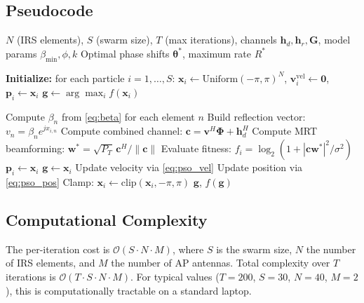 \documentclass[12pt, a4paper]{article}
\newcommand{\vect}[1]{\mathbf{#1}}          %
\newcommand{\mat}[1]{\mathbf{#1}}           %
\newcommand{\norm}[1]{\left\|#1\right\|}    %
\begin{document}
\subsection{Pseudocode}
\begin{algorithm}[H]
\caption{PSO for IRS Phase Shift Optimization}
\label{alg:pso}
\begin{algorithmic}[1]
\Require $N$ (IRS elements), $S$ (swarm size), $T$ (max iterations),
         channels $\vect{h}_d, \vect{h}_r, \mat{G}$,
         model params $\beta_{\min}, \phi, k$
\Ensure  Optimal phase shifts $\vect{\theta}^*$, maximum rate $R^*$

\State \textbf{Initialize:} for each particle $i = 1,\ldots,S$:
    $\vect{x}_i \leftarrow \text{Uniform}(-\pi, \pi)^N$,
    $\vect{v}_i^{\text{vel}} \leftarrow \vect{0}$,
    $\vect{p}_i \leftarrow \vect{x}_i$
\State $\vect{g} \leftarrow \arg\max_i f(\vect{x}_i)$

        \State Compute $\beta_n$ from \eqref{eq:beta} for each element $n$
        \State Build reflection vector: $v_n = \beta_n e^{j x_{i,n}}$
        \State Compute combined channel:
               $\vect{c} = \vect{v}^H\boldsymbol{\Phi} + \vect{h}_d^H$
        \State Compute MRT beamforming:
               $\vect{w}^* = \sqrt{P_T}\,\vect{c}^H / \norm{\vect{c}}$
        \State Evaluate fitness: $f_i = \log_2(1 + |\vect{c}\vect{w}^*|^2/\sigma^2)$
        \If{$f_i > f(\vect{p}_i)$}
            $\vect{p}_i \leftarrow \vect{x}_i$
        \EndIf
        \If{$f_i > f(\vect{g})$}
            $\vect{g} \leftarrow \vect{x}_i$
        \EndIf
        \State Update velocity via \eqref{eq:pso_vel}
        \State Update position via \eqref{eq:pso_pos}
        \State Clamp: $\vect{x}_i \leftarrow \text{clip}(\vect{x}_i, -\pi, \pi)$
    \EndFor
\EndFor
\State \Return $\vect{g}$, $f(\vect{g})$
\end{algorithmic}
\end{algorithm}

\subsection{Computational Complexity}
The per-iteration cost is $\mathcal{O}(S \cdot N \cdot M)$, where $S$ is the
swarm size, $N$ the number of IRS elements, and $M$ the number of AP antennas.
Total complexity over $T$ iterations is $\mathcal{O}(T \cdot S \cdot N \cdot M)$.
For typical values ($T=200$, $S=30$, $N=40$, $M=2$), this is computationally
tractable on a standard laptop.
\end{document}
